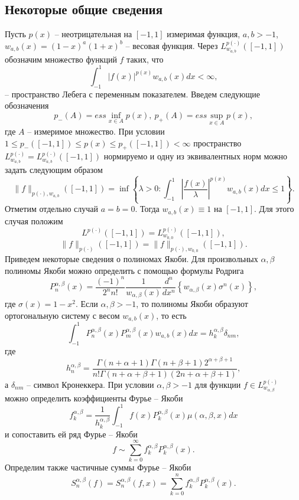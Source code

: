 \subsection{Некоторые общие сведения}\label{Intro-Tadg}
Пусть $p(x)$ -- неотрицательная на $[-1,1]$ измеримая функция, $a,b>-1$, $w_{a,b}(x)=(1-x)^a(1+x)^b$ -- весовая функция. Через $L^{p(\cdot)}_{w_{a,b}}([-1,1])$ обозначим множество функций $f$ таких, что
\begin{equation}\label{s2-lpx-def-1}
  \int_{-1}^1|f(x)|^{p(x)}w_{a,b}(x)dx<\infty,
\end{equation}
-- пространство Лебега с переменным показателем. Введем следующие обозначения
$$p_-(A)=ess\inf_{x\in A}p(x),\ p_+(A)=ess\sup_{x\in A}p(x),$$
где $A$ -- измеримое множество.
 При условии $1\le p_-([-1,1])\le p(x)\le p_+([-1,1])<\infty$ пространство $L^{p(\cdot)}_{w_{a,b}}=L^{p(\cdot)}_{w_{a,b}}([-1,1])$ нормируемо \cite{tad-lpxtopology} и одну из эквивалентных норм можно задать следующим образом
\begin{equation}\label{s2-lpx-norm}
  \|f\|_{p(\cdot),w_{a,b}}([-1,1])=\inf\left\{\lambda>0:\int_{-1}^1\left|\frac{f(x)}\lambda\right|^{p(x)}w_{a,b}(x)dx\le1\right\}.
\end{equation}
Отметим отдельно случай $a=b=0$. Тогда $w_{a,b}(x)\equiv1$ на $[-1,1]$. Для этого случая положим $$L^{p(\cdot)}([-1,1])=L^{p(\cdot)}_{w_{0,0}}([-1,1]),$$
$$\|f\|_{p(\cdot)}([-1,1])=\|f\|_{p(\cdot),w_{0,0}}([-1,1]).$$
Приведем некоторые сведения о полиномах Якоби. Для произвольных $\alpha,\beta$ полиномы Якоби можно определить с помощью формулы Родрига
\begin{equation}\label{RodrigueFormula}
  P_n^{\alpha,\beta}(x) = \frac{(-1)^n}{2^nn!}\frac1{w_{\alpha,\beta}(x)}\frac{d^n}{dx^n} \left\{w_{\alpha,\beta}(x)\sigma^n(x)\right\},
\end{equation}
где $\sigma(x)=1-x^2$. Если $\alpha,\beta>-1$, то полиномы Якоби образуют ортогональную систему с весом  $w_{a,b}(x)$, то есть
\begin{equation}\label{JacobiOrthognality}
	\int_{-1}^1P_n^{\alpha,\beta}(x)P_m^{\alpha,\beta}(x)w_{a,b}(x)dx=h_k^{\alpha,\beta}\delta_{nm},
\end{equation}
где 
$$
h_n^{\alpha,\beta} =
\frac{\Gamma(n+\alpha+1)\Gamma(n+\beta+1)2^{\alpha+\beta+1}}
{n!\Gamma(n+\alpha+\beta+1)(2n+\alpha+\beta+1)},
$$
а $\delta_{nm}$ -- символ Кронеккера.
При условии $\alpha,\beta>-1$ для функции $f\in L^{p(\cdot)}_{w_{\alpha,\beta}}$ можно определить коэффициенты Фурье -- Якоби
$$
f_k^{\alpha,\beta}=\frac{1}{h_k^{\alpha,\beta}}\int_{-1}^1f(x)P_k^{\alpha,\beta}(x)
\mu(\alpha,\beta,x)dx
$$
и сопоставить ей ряд Фурье -- Якоби
$$
f\sim \sum_{k=0}^\infty f_k^{\alpha,\beta}P_k^{\alpha,\beta}(x).
$$
Определим также частичные суммы Фурье -- Якоби
$$
S_n^{\alpha,\beta}(f)=S_n^{\alpha,\beta}(f,x)=\sum_{k=0}^nf_k^{\alpha,\beta}P_k^{\alpha,\beta}(x).
$$

